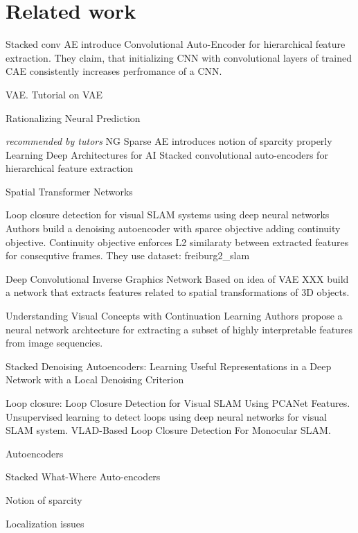 
\chapter{Related work}
\label{cha:rewo}
Stacked conv AE \cite{Masci2011} introduce Convolutional Auto-Encoder for hierarchical feature extraction.
They claim, that initializing CNN with convolutional layers of trained CAE consistently increases perfromance of a CNN.

VAE. Tutorial on VAE \cite{Doersch2016}

Rationalizing Neural Prediction \cite{Lei2016}


\textit{recommended by tutors}
NG Sparse AE  \cite{Ng2011} introduces notion of sparcity properly
Learning Deep Architectures for AI \cite{Bengio2009}
Stacked convolutional auto-encoders for hierarchical feature extraction \cite{Masci2011}

Spatial Transformer Networks \cite{Jaderberg2015}

Loop closure detection for visual SLAM systems using deep neural networks \cite{Gao2015}
Authors build a denoising autoencoder with sparce objective adding continuity objective.
Continuity objective enforces L2 similaraty between extracted features for consequtive frames.
They use dataset: freiburg2_slam

Deep Convolutional Inverse Graphics Network\cite{Kulkarni2015}
Based on idea of VAE XXX build a network that extracts features related to spatial transformations of 3D objects.

Understanding Visual Concepts with Continuation Learning \cite{Whitney2016}
Authors propose a neural network archtecture for extracting a subset of highly interpretable features
from image sequencies.

Stacked Denoising Autoencoders: Learning Useful Representations in a Deep Network with a Local Denoising Criterion \cite{VincentPASCALVINCENT2010}

Loop closure:
Loop Closure Detection for Visual SLAM Using PCANet Features.
Unsupervised learning to detect loops using deep neural networks for visual SLAM system.
VLAD-Based Loop Closure Detection For Monocular SLAM.
\cite{Xia2016, Gao2015a, Huang2016}


Autoencoders

Stacked What-Where Auto-encoders \cite{Zhao2015}


Notion of sparcity


Localization issues
